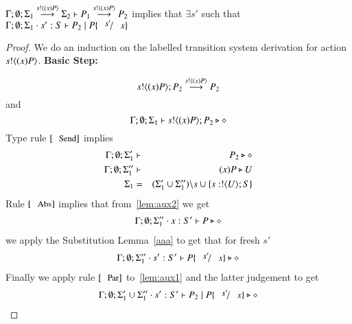 \begin{lemma}\rm
	\label{lem:aux}
		$\Gamma; \emptyset; \Sigma_1 \stackrel{s ! \langle (x) P \rangle}{\longrightarrow} \Sigma_2 \vdash P_1 \stackrel{s ! \langle (x) P \rangle}{\longrightarrow} P_2$
		implies that $\exists s'$ such that $\Gamma; \emptyset; \Sigma_1 \cat s': S \proves P_2 \Par P \subst{s'}{x}$
\end{lemma}

\begin{proof}

	\noi We do an induction on the labelled transition system
	derivation for action $s ! \langle (x) P \rangle$.
	{\bf Basic Step: }

	\[
		s ! \langle (x) P \rangle ; P_2 \stackrel{s ! \langle (x) P \rangle}{\longrightarrow} P_2
	\]
	\noi and
	\[
		\Gamma; \emptyset; \Sigma_1 \vdash s ! \langle (x) P \rangle ; P_2 \triangleright \diamond
	\]
	\noi Type rule $\trule{Send}$ implies
	\begin{eqnarray}
		\Gamma; \emptyset; \Sigma_1' &\vdash& P_2 \triangleright \diamond \label{lem:aux1}\\
		\Gamma; \emptyset; \Sigma_1'' &\vdash& (x) P \triangleright U \label{lem:aux2} \\
		\Sigma_1 &=& (\Sigma_1' \cup \Sigma_1'')\backslash s \cup \{s: ! \langle U \rangle ; S\}
	\end{eqnarray}
	\noi Rule $\trule{Abs}$ implies that from~\ref{lem:aux2} we get
	\begin{eqnarray*}
		\Gamma; \emptyset; \Sigma_1'' \cdot x: S' \vdash P \triangleright \diamond
	\end{eqnarray*}
	\noi we apply the Substitution Lemma~\ref{aaa} to get that for fresh $s'$
	\begin{eqnarray*}
		\Gamma; \emptyset; \Sigma_1'' \cat s': S' \proves P\subst{s'}{x} \hastype \Proc
	\end{eqnarray*}
	\noi Finally we apply rule $\trule{Par}$ to~\ref{lem:aux1} and the latter judgement to get
	\begin{eqnarray*}
		\Gamma; \emptyset; \Sigma_1' \cup \Sigma_1'' \cat s': S' \proves P_2 \Par P\subst{s'}{x} \hastype \Proc
	\end{eqnarray*}



\end{proof}
